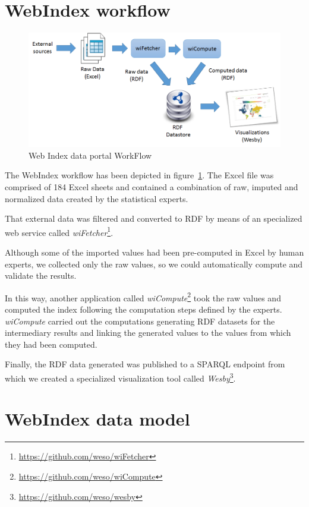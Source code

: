 \documentclass{llncs}
\begin{document}
\section{WebIndex workflow}

\begin{figure}[h]
\begin{center}
  \includegraphics[width=\textwidth]{WebIndexFlow}
\end{center}
\caption{Web Index data portal WorkFlow}
\label{Fig:WebIndexWorkFlow}
\end{figure}

The WebIndex workflow has been depicted in figure~\ref{Fig:WebIndexWorkFlow}. 
The Excel file was comprised of 184 Excel sheets and contained a combination
 of raw, imputed and normalized data created by the statistical experts. 

That external data was filtered and converted to RDF by means of an specialized web service called \emph{wiFetcher}\footnote{\url{https://github.com/weso/wiFetcher}}. 

Although some of the imported values had been
 pre-computed in Excel by human experts, we collected only the raw values, so we could automatically compute and validate the results. 

In this way, another application called \emph{wiCompute}\footnote{\url{https://github.com/weso/wiCompute}} 
 took the raw values and computed the index following the
 computation steps defined by the experts. 
\emph{wiCompute} carried out the computations
 generating RDF datasets for the intermediary results and linking the generated values
 to the values from which they had been computed.
 
Finally, the RDF data generated was published to a SPARQL endpoint from which we created
a specialized visualization tool called \emph{Wesby}\footnote{\url{https://github.com/weso/wesby}}.


\section{WebIndex data model}
\end{document}
